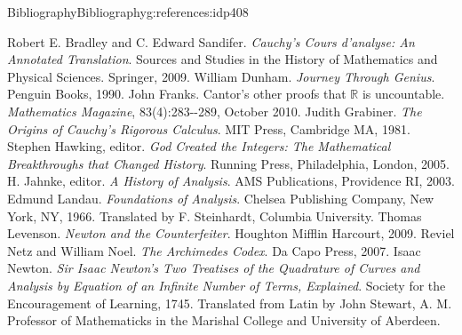 \documentclass[oneside,10pt,]{book}
\numberwithin{equation}{section}
\newcommand{\RR}{\mathbb {R}}
\begin{document}
\begin{references-chapter-numberless}{Bibliography}{}{Bibliography}{}{}{g:references:idp408}
\begin{referencelist}
\hypertarget{x:biblio:bradley09__cauch_cours}{}Robert E. Bradley and C. Edward Sandifer. \emph{\textit{Cauchy's Cours d'analyse}: An Annotated Translation}. Sources and Studies in the History of Mathematics and Physical Sciences. Springer, 2009.
\hypertarget{x:biblio:dunham90__journ_throug_genius}{}William Dunham. \emph{Journey Through Genius}. Penguin Books, 1990.
\hypertarget{x:biblio:franks10__cantor_other_proof_rr_uncoun}{}John Franks. Cantor's other proofs that \(\RR\) is uncountable. \emph{Mathematics Magazine}, 83(4):283-{}-{}289, October 2010.
\hypertarget{x:biblio:grabiner81__origin_cauch_rigor_calculy}{}Judith Grabiner. \emph{The Origins of Cauchy's Rigorous Calculus}. MIT Press, Cambridge MA, 1981.
\hypertarget{x:biblio:hawking05__god_creat_integ}{}Stephen Hawking, editor. \emph{God Created the Integers: The Mathematical Breakthroughs that Changed History}. Running Press, Philadelphia, London, 2005.
\hypertarget{x:biblio:jahnke03__histor_analy}{}H. Jahnke, editor. \emph{A History of Analysis}. AMS Publications, Providence RI, 2003.
\hypertarget{x:biblio:landau66__found_analy}{}Edmund Landau. \emph{Foundations of Analysis}. Chelsea Publishing Company, New York, NY, 1966. Translated by F. Steinhardt, Columbia University.
\hypertarget{x:biblio:levenson09__newton_count}{}Thomas Levenson. \emph{Newton and the Counterfeiter}. Houghton Mifflin Harcourt, 2009.
\hypertarget{x:biblio:netz07__archim_codex}{}Reviel Netz and William Noel. \emph{The Archimedes Codex}. Da Capo Press, 2007.
\hypertarget{x:biblio:newton45__sir_isaac_two_treat_quadr}{}Isaac Newton. \emph{Sir Isaac Newton's Two Treatises of the Quadrature of Curves and Analysis by Equation of an Infinite Number of Terms, Explained}. Society for the Encouragement of Learning, 1745. Translated from Latin by John Stewart, A. M. Professor of Mathematicks in the Marishal College and University of Aberdeen.

\end{referencelist}
\end{references-chapter-numberless}
\end{document}

